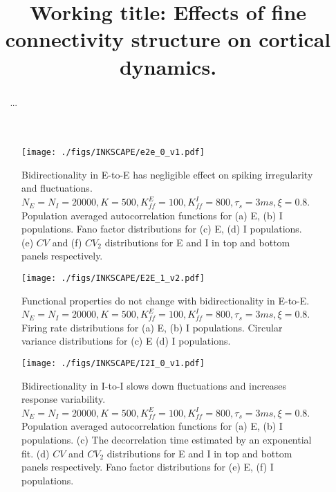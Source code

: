\documentclass[10pt, a4paper, twocolumn]{article}
\title{Working title: Effects of fine connectivity structure on cortical dynamics.}
\date{}
\begin{document}
\maketitle
\begin{@twocolumnfalse}
    \maketitle
    \begin{abstract}
      ...
    \end{abstract}
  \end{@twocolumnfalse}






\newpage
\begin{small}


\end{small}

\newpage
\begin{figure*}
\centering
\texttt{[image: ./figs/INKSCAPE/e2e\_0\_v1.pdf]}
\caption{Bidirectionality in E-to-E has negligible effect on spiking irregularity and fluctuations. $N_E = N_I = 20000, K = 500, K_{ff}^E = 100, K_{ff}^I = 800, \tau_s = 3ms, \xi = 0.8$. Population averaged autocorrelation functions for (a) E, (b) I populations. Fano factor distributions for (c) E, (d) I populations. (e) $CV$ and (f) $CV_{2}$ distributions for E and I in top and bottom panels respectively.}
\label{fig:e2e0}
\end{figure*}

\begin{figure*}
\centering
\texttt{[image: ./figs/INKSCAPE/E2E\_1\_v2.pdf]}
\caption{Functional properties do not change with bidirectionality in E-to-E. $N_E = N_I = 20000, K = 500, K_{ff}^E = 100, K_{ff}^I = 800, \tau_s = 3ms, \xi = 0.8$. Firing rate distributions for (a) E, (b) I populations. Circular variance distributions for (c) E (d) I populations.}
\label{fig:e2e1}
\end{figure*}

\begin{figure*}
\centering
\texttt{[image: ./figs/INKSCAPE/I2I\_0\_v1.pdf]}
\caption{Bidirectionality in I-to-I slows down fluctuations and increases response variability. $N_E = N_I = 20000, K = 500, K_{ff}^E = 100, K_{ff}^I = 800, \tau_s = 3ms, \xi = 0.8$. Population averaged autocorrelation functions for (a) E, (b) I populations. (c) The decorrelation time estimated by an exponential fit. (d) $CV$ and $CV_{2}$ distributions for E and I in top and bottom panels respectively. Fano factor distributions for (e) E, (f) I populations.}
\label{fig:i2i0}
\end{figure*}
               
\end{document}
